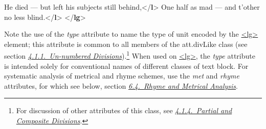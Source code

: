 \begin{shaded}
\mbox{}\newline 
{}\mbox{}\newline 
\hspace*{1em}He died — but left his subjects still behind,{</\textbf{l}>}\mbox{}\newline 
\hspace*{1em}One half as mad — and t'other no less blind.{</\textbf{l}>}\mbox{}\newline 
{}\mbox{}\newline 
{</\textbf{lg}>}\end{shaded}\egroup\par \noindent  \par
Note the use of the {\itshape type} attribute to name the type of unit encoded by the \hyperref[TEI.lg]{<lg>} element; this attribute is common to all members of the \textsf{att.divLike} class (see section \textit{\hyperref[DSDIV1]{4.1.1.\ Un-numbered Divisions}}).\footnote{For discussion of other attributes of this class, see \textit{\hyperref[DSDIV3X]{4.1.4.\ Partial and Composite Divisions}}.} When used on \hyperref[TEI.lg]{<lg>}, the {\itshape type} attribute is intended solely for conventional names of different classes of text block. For systematic analysis of metrical and rhyme schemes, use the {\itshape met} and {\itshape rhyme} attributes, for which see below, section \textit{\hyperref[VEME]{6.4.\ Rhyme and Metrical Analysis}}.\par
